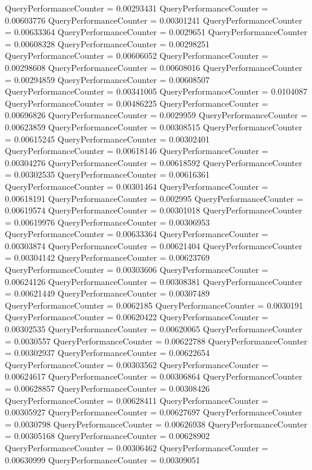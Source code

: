 \documentclass[9pt]{article}
\theoremstyle{plain}
\theoremstyle{definition}
\theoremstyle{remark}
\numberwithin{equation}{section}
\begin{document}
QueryPerformanceCounter  =  0.00293431
QueryPerformanceCounter  =  0.00603776
QueryPerformanceCounter  =  0.00301241
QueryPerformanceCounter  =  0.00633364
QueryPerformanceCounter  =  0.0029651
QueryPerformanceCounter  =  0.00608328
QueryPerformanceCounter  =  0.00298251
QueryPerformanceCounter  =  0.00606052
QueryPerformanceCounter  =  0.00298608
QueryPerformanceCounter  =  0.00608016
QueryPerformanceCounter  =  0.00294859
QueryPerformanceCounter  =  0.00608507
QueryPerformanceCounter  =  0.00341005
QueryPerformanceCounter  =  0.0104087
QueryPerformanceCounter  =  0.00486225
QueryPerformanceCounter  =  0.00696826
QueryPerformanceCounter  =  0.0029959
QueryPerformanceCounter  =  0.00623859
QueryPerformanceCounter  =  0.00308515
QueryPerformanceCounter  =  0.00615245
QueryPerformanceCounter  =  0.00302401
QueryPerformanceCounter  =  0.00618146
QueryPerformanceCounter  =  0.00304276
QueryPerformanceCounter  =  0.00618592
QueryPerformanceCounter  =  0.00302535
QueryPerformanceCounter  =  0.00616361
QueryPerformanceCounter  =  0.00301464
QueryPerformanceCounter  =  0.00618191
QueryPerformanceCounter  =  0.002995
QueryPerformanceCounter  =  0.00619574
QueryPerformanceCounter  =  0.00301018
QueryPerformanceCounter  =  0.00619976
QueryPerformanceCounter  =  0.00306953
QueryPerformanceCounter  =  0.00633364
QueryPerformanceCounter  =  0.00303874
QueryPerformanceCounter  =  0.00621404
QueryPerformanceCounter  =  0.00304142
QueryPerformanceCounter  =  0.00623769
QueryPerformanceCounter  =  0.00303606
QueryPerformanceCounter  =  0.00624126
QueryPerformanceCounter  =  0.00308381
QueryPerformanceCounter  =  0.00621449
QueryPerformanceCounter  =  0.00307489
QueryPerformanceCounter  =  0.0062185
QueryPerformanceCounter  =  0.0030191
QueryPerformanceCounter  =  0.00620422
QueryPerformanceCounter  =  0.00302535
QueryPerformanceCounter  =  0.00620065
QueryPerformanceCounter  =  0.0030557
QueryPerformanceCounter  =  0.00622788
QueryPerformanceCounter  =  0.00302937
QueryPerformanceCounter  =  0.00622654
QueryPerformanceCounter  =  0.00303562
QueryPerformanceCounter  =  0.00624617
QueryPerformanceCounter  =  0.00306864
QueryPerformanceCounter  =  0.00628857
QueryPerformanceCounter  =  0.00308426
QueryPerformanceCounter  =  0.00628411
QueryPerformanceCounter  =  0.00305927
QueryPerformanceCounter  =  0.00627697
QueryPerformanceCounter  =  0.0030798
QueryPerformanceCounter  =  0.00626938
QueryPerformanceCounter  =  0.00305168
QueryPerformanceCounter  =  0.00628902
QueryPerformanceCounter  =  0.00306462
QueryPerformanceCounter  =  0.00630999
QueryPerformanceCounter  =  0.00309051
\end{document}
